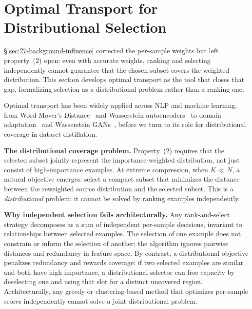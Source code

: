 \section{Optimal Transport for Distributional Selection} \label{sec:28-background-ot}

\S\ref{sec:27-background-influence} corrected the per-sample weights but left property~(2) open: even with accurate weights, ranking and selecting independently cannot guarantee that the chosen subset covers the weighted distribution.
This section develops optimal transport as the tool that closes that gap, formalizing selection as a distributional problem rather than a ranking one.

\begin{foldable}
  Optimal transport has been widely applied across \ac{NLP} and machine learning, from Word Mover's Distance~\cite{kusner2015word} and Wasserstein autoencoders~\cite{tolstikhin2018wasserstein} to domain adaptation~\cite{courty2016optimal} and Wasserstein \acp{GAN}~\cite{arjovsky2017wasserstein}, before we turn to its role for distributional coverage in dataset distillation.
\end{foldable}

\begin{foldable}
  \textbf{The distributional coverage problem.}
  Property~(2) requires that the selected subset jointly represent the importance-weighted distribution, not just consist of high-importance examples.
  At extreme compression, when $K \ll N$, a natural objective emerges: select a compact subset that minimizes the distance between the reweighted source distribution and the selected subset.
  This is a \textit{distributional} problem: it cannot be solved by ranking examples independently.
\end{foldable}

\begin{foldable}
  \textbf{Why independent selection fails architecturally.}
  Any rank-and-select strategy decomposes as a sum of independent per-sample decisions, invariant to relationships between selected examples.
  The selection of one example does not constrain or inform the selection of another; the algorithm ignores pairwise distances and redundancy in feature space.
  By contrast, a distributional objective penalizes redundancy and rewards coverage: if two selected examples are similar and both have high importance, a distributional selector can free capacity by deselecting one and using that slot for a distinct uncovered region.
  Architecturally, any greedy or clustering-based method that optimizes per-sample scores independently cannot solve a joint distributional problem.
\end{foldable}

